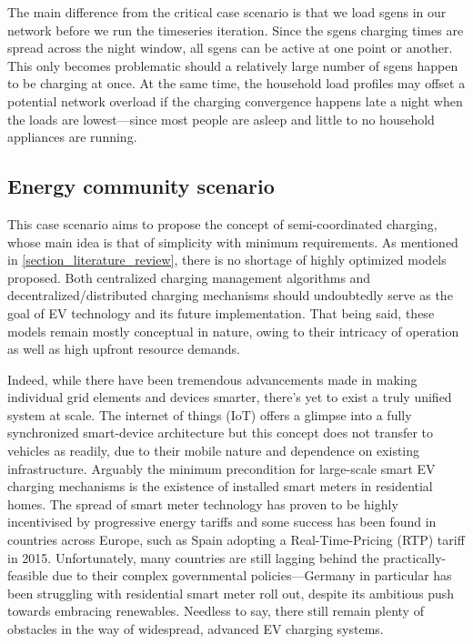\documentclass[a4paper,10pt]{report}
\begin{document}
The main difference from the critical case scenario is that we load sgens in our network before we run the timeseries iteration. Since the sgens charging times are spread across the night window, all sgens can be active at one point or another. This only becomes problematic should a relatively large number of sgens happen to be charging at once. At the same time, the household load profiles may offset a potential network overload if the charging convergence happens late a night when the loads are lowest---since most people are asleep and little to no household appliances are running.


\subsection{Energy community scenario}
This case scenario aims to propose the concept of semi-coordinated charging, whose main idea is that of simplicity with minimum requirements. As mentioned in  \cref{section_literature_review}, there is no shortage of highly optimized models proposed. Both centralized charging management algorithms and decentralized/distributed charging mechanisms should undoubtedly serve as the goal of EV technology and its future implementation. That being said, these models remain mostly conceptual in nature, owing to their intricacy of operation as well as high upfront resource demands.

Indeed, while there have been tremendous advancements made in making individual grid elements and devices smarter, there's yet to exist a truly unified system at scale. The internet of things (IoT) offers a glimpse into a fully synchronized smart-device architecture but this concept does not transfer to vehicles as readily, due to their mobile nature and dependence on existing infrastructure. Arguably the minimum precondition for large-scale smart EV charging mechanisms is the existence of installed smart meters in residential homes. The spread of smart meter technology has proven to be highly incentivised by progressive energy tariffs and some success has been found in countries across Europe, such as Spain adopting a Real-Time-Pricing (RTP) tariff in 2015. Unfortunately, many countries are still lagging behind the practically-feasible due to their complex governmental policies---Germany in particular has been struggling with residential smart meter roll out, despite its ambitious push towards embracing renewables. Needless to say, there still remain plenty of obstacles in the way of widespread, advanced EV charging systems.
\end{document}
